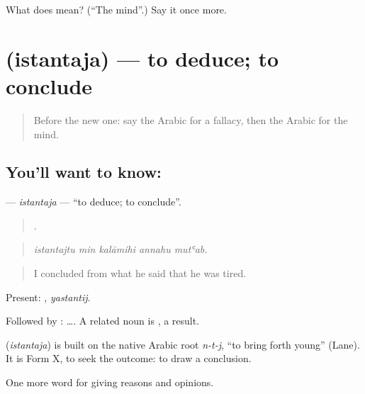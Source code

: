 \begin{tcolorbox}[breakable,colback=teal!4,colframe=teal!35!black,title={Before you move on}]
What does  mean? (\textquotedblleft{}The mind\textquotedblright{}.) Say it once more.
\end{tcolorbox}
\section[\texorpdfstring{\ar{استنتج} (istantaja)}{استنتج (istantaja)}]{ (istantaja) — to deduce; to conclude}

\label{lesson:AR-C362-istantaja}



\begin{quote}
Before the new one: say the Arabic for a fallacy, then the Arabic for the mind.
\end{quote}

\subsection*{You'll want to know: }
\textbf{} — \emph{istantaja} — \textquotedblleft{}to deduce; to conclude\textquotedblright{}.

\begin{quote}
    .
\end{quote}

\begin{quote}
\emph{istantajtu min kalāmihi annahu mutʿab.}
\end{quote}

\begin{quote}
I concluded from what he said that he was tired.
\end{quote}

Present: , \emph{yastantij}.

Followed by :   …. A related noun is , a result.

\begin{cousinweb}
\textbf{} (\emph{istantaja}) is built on the native Arabic root \emph{n-t-j}, \textquotedblleft{}to bring forth young\textquotedblright{} (Lane). It is Form X, to seek the outcome: to draw a conclusion.
\end{cousinweb}

\begin{grammarlens}[title={What you've built}]
One more word for giving reasons and opinions.
\end{grammarlens}

